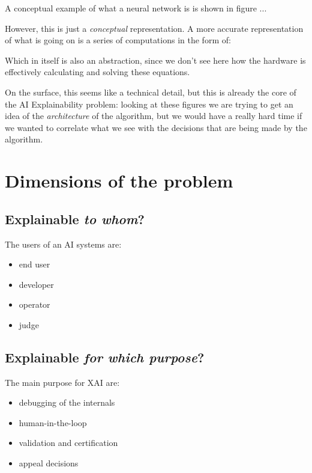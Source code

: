 \documentclass[conference]{IEEEtran}
\begin{document}
A conceptual example of what a neural network is is shown in figure ...


However, this is just a \textit{conceptual} representation. A more accurate
representation of what is going on is a series of computations in the form of:


Which in itself is also an abstraction, since we don't see here how the hardware
is effectively calculating and solving these equations.

On the surface, this seems like a technical detail, but this is already the core
of the AI Explainability problem: looking at these figures we are trying to get
an idea of the \textit{architecture} of the algorithm, but we would have a
really hard time if we wanted to correlate what we see with the decisions that
are being made by the algorithm.

\section{Dimensions of the problem}
\label{sec:explainability}

\subsection{Explainable \textit{to whom}?}

The users of an AI systems are:

\begin{itemize}
    \item end user
    \item developer
    \item operator
    \item judge
\end{itemize}

\subsection{Explainable \textit{for which purpose}?}

The main purpose for XAI are:

\begin{itemize}
    \item debugging of the internals
    \item human-in-the-loop
    \item validation and certification
    \item appeal decisions
\end{itemize}
\end{document}
